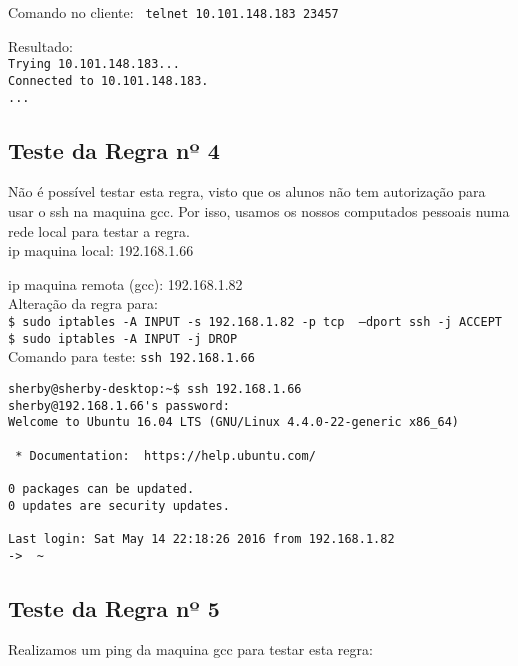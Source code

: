 \documentclass[12pt, a4paper, twoside]{report} %
\begin{document}
\noindent Comando no cliente: \texttt{ telnet 10.101.148.183 23457}

\noindent Resultado: \\

\noindent \texttt{Trying 10.101.148.183...} \\
\noindent \texttt{Connected to 10.101.148.183.} \\
\noindent \texttt{...}

\clearpage

\subsection{Teste da Regra nº 4}

\noindent Não é possível testar esta regra, visto que os alunos não tem autorização para usar o ssh na maquina gcc. Por isso, 
usamos os nossos computados pessoais numa rede local para testar a regra. \\

\noindent ip maquina local: 192.168.1.66

\noindent ip maquina remota (gcc): 192.168.1.82 \\

\noindent Alteração da regra para: \\
\texttt{\$ sudo iptables -A INPUT -s 192.168.1.82 -p tcp \
 --dport ssh -j ACCEPT} \\
\texttt{\$ sudo iptables -A INPUT -j DROP} \\


\noindent Comando para teste: \texttt{ssh 192.168.1.66}

\begin{lstlisting}
sherby@sherby-desktop:~$ ssh 192.168.1.66
sherby@192.168.1.66's password: 
Welcome to Ubuntu 16.04 LTS (GNU/Linux 4.4.0-22-generic x86_64)

 * Documentation:  https://help.ubuntu.com/

0 packages can be updated.
0 updates are security updates.

Last login: Sat May 14 22:18:26 2016 from 192.168.1.82
->  ~ 
\end{lstlisting}

\subsection{Teste da Regra nº 5}

\noindent Realizamos um ping da maquina gcc para testar esta regra: \\
\end{document}

